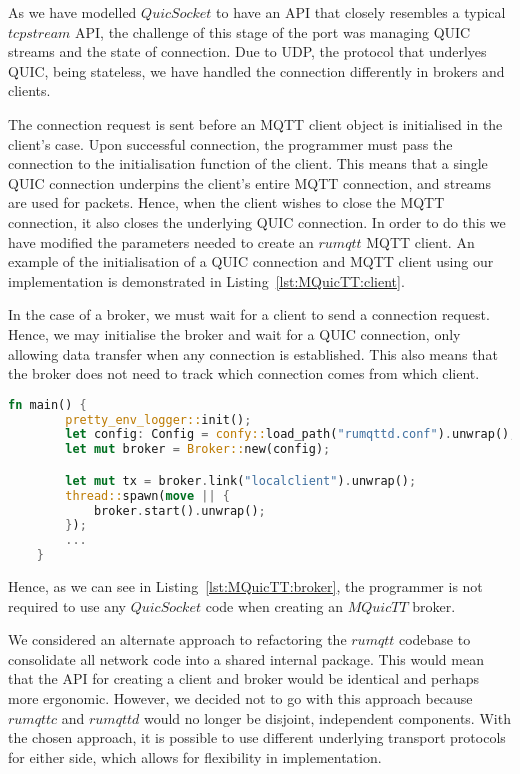 As we have modelled $QuicSocket$ to have an API that closely resembles a typical $tcpstream$ API, the challenge of this stage of the port was managing QUIC streams and the state of connection.
Due to UDP, the protocol that underlyes QUIC, being stateless, we have handled the connection differently in brokers and clients.

The connection request is sent before an MQTT client object is initialised in the client's case.
Upon successful connection, the programmer must pass the connection to the initialisation function of the client.
This means that a single QUIC connection underpins the client's entire MQTT connection, and streams are used for packets.
Hence, when the client wishes to close the MQTT connection, it also closes the underlying QUIC connection.
In order to do this we have modified the parameters needed to create an $rumqtt$ MQTT client.
An example of the initialisation of a QUIC connection and MQTT client using our implementation is demonstrated in Listing~\ref{lst:MQuicTT:client}.

In the case of a broker, we must wait for a client to send a connection request.
Hence, we may initialise the broker and wait for a QUIC connection, only allowing data transfer when any connection is established.
This also means that the broker does not need to track which connection comes from which client.

\begin{lstlisting}[language=Rust, caption={An example of initialising an MQuicTT broker. We can see that no operations with $QuicSocket$ are required for this initialisation as all QUIC operations are handled internally.}, label=lst:MQuicTT:broker]
    fn main() {
        pretty_env_logger::init();
        let config: Config = confy::load_path("rumqttd.conf").unwrap();
        let mut broker = Broker::new(config);

        let mut tx = broker.link("localclient").unwrap();
        thread::spawn(move || {
            broker.start().unwrap();
        });
        ...
    }

\end{lstlisting}

Hence, as we can see in Listing~\ref{lst:MQuicTT:broker}, the programmer is not required to use any $QuicSocket$ code when creating an $MQuicTT$ broker.

We considered an alternate approach to refactoring the $rumqtt$ codebase to consolidate all network code into a shared internal package.
This would mean that the API for creating a client and broker would be identical and perhaps more ergonomic.
However, we decided not to go with this approach because $rumqttc$ and $rumqttd$ would no longer be disjoint, independent components.
With the chosen approach, it is possible to use different underlying transport protocols for either side, which allows for flexibility in implementation.

